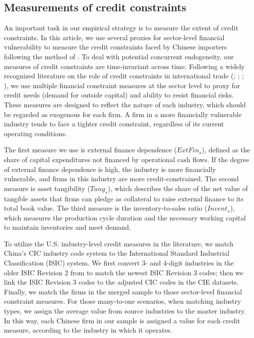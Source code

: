 \subsection{Measurements of credit constraints} \label{Measurements-Credit Constraints}

An important task in our empirical strategy is to measure the extent of credit constraints. In this article, we use several proxies for sector-level financial vulnerability to measure the credit constraints faced by Chinese importers following the method of \cite{manova2013}. To deal with potential concurrent endogeneity, our measures of credit constraints are time-invariant across time. Following a widely recognized literature on the role of credit constraints in international trade (\cite{kroszner2007}; \cite{manova2013}; \cite{manova-wei-zhang2015}; \cite{fan-lai-li2015}), we use multiple financial constraint measures at the sector level to proxy for credit needs (demand for outside capital) and ability to resist financial risks. These measures are designed to reflect the nature of each industry, which should be regarded as exogenous for each firm. A firm in a more financially vulnerable industry tends to face a tighter credit constraint, regardless of its current operating conditions.

The first measure we use is external finance dependence ($ExtFin_{s}$), defined as the share of capital expenditures not financed by operational cash flows. If the degree of external finance dependence is high, the industry is more financially vulnerable, and firms in this industry are more credit-constrained. The second measure is asset tangibility ($Tang_{s}$), which describes the share of the net value of tangible assets that firms can pledge as collateral to raise external finance to its total book value. The third measure is the inventory-to-sales ratio ($Invent_{s}$), which measures the production cycle duration and the necessary working capital to maintain inventories and meet demand. 

To utilize the U.S. industry-level credit measures in the literature, we match China's CIC industry code system to the International Standard Industrial Classification (ISIC) system. We first convert 3- and 4-digit industries in the older ISIC Revision 2 from \cite{manova-wei-zhang2015} to match the newest ISIC Revision 3 codes; then we link the ISIC Revision 3 codes to the adjusted CIC codes in the CIE datasets. Finally, we match the firms in the merged sample to those sector-level financial constraint measures. For those many-to-one scenarios, when matching industry types, we assign the average value from source industries to the master industry. In this way, each Chinese firm in our sample is assigned a value for each credit measure, according to the industry in which it operates.

